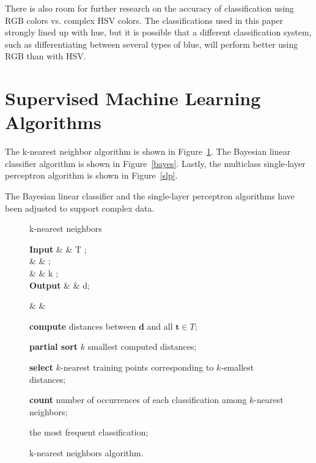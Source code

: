 \documentclass[twoside]{IEEEtran}
\begin{document}
There is also room for further research on the accuracy of classification using RGB colors vs.
complex HSV colors. The classifications used in this paper strongly lined up with hue, but it is
possible that a different classification system, such as differentiating between several types of
blue, will perform better using RGB than with HSV.\@

\appendices%

\section{Supervised Machine Learning Algorithms}%
\label{algorithms}

The k-nearest neighbor algorithm is shown in Figure~\ref{knn}. The Bayesian linear classifier algorithm is
shown in Figure~\ref{bayes}. Lastly, the multiclass single-layer perceptron algorithm is shown in Figure~\ref{slp}.

The Bayesian linear classifier and the single-layer perceptron algorithms have been adjusted to
support complex data.

\begin{figure}[!b]
    \centering
    \setlength{\intextsep}{0pt}

    \begin{algorithm}[H]
        \caption{k-nearest neighbors}

        \begin{flalign*}
            \setlength{\arraycolsep}{0pt}
            \begin{matrix*}[l]
                \textbf{Input}  & \text{: } & T ; \\
                \text{}         &           &  ;  \\
                \text{}         &           & k ;   \\
                \textbf{Output} & \text{: } &  d;
            \end{matrix*} &  &
        \end{flalign*}
        \begin{algorithmic}
            \State%
            \textbf{compute} distances between \( \mathbf{d} \) and all \( \mathbf{t} \in T \);

            \State%
            \textbf{partial sort} \( k \) smallest computed distances;

            \State%
            \textbf{select} \( k \)-nearest training points corresponding to \( k \)-smallest distances;

            \State%
            \textbf{count} number of occurrences of each classification among \( k \)-nearest neighbors;

            \State\Return%
            the most frequent classification;
        \end{algorithmic}
    \end{algorithm}

    \caption{k-nearest neighbors algorithm.}%
    \label{knn}
\end{figure}
\end{document}
